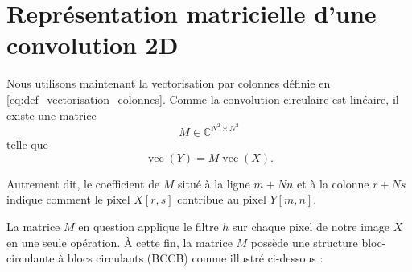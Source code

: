 \section{Représentation matricielle d'une convolution 2D}

Nous utilisons maintenant la vectorisation par colonnes définie en
\eqref{eq:def_vectorisation_colonnes}. Comme la convolution circulaire est linéaire, il existe
une matrice
\[
    M \in \mathbb{C}^{N^2\times N^2}
\]
telle que
\begin{equation}
    \operatorname{vec}(Y)
    =
    M\operatorname{vec}(X).
\end{equation}

Autrement dit, le coefficient de $M$ situé à la ligne $m+Nn$ et à la colonne $r+Ns$ indique comment le pixel
$X[r,s]$ contribue au pixel $Y[m,n]$.

La matrice $M$ en question applique le filtre $h$ sur chaque pixel de notre image $X$ en une seule opération.
À cette fin, la matrice $M$ possède une structure bloc-circulante à blocs circulants (BCCB)
comme illustré ci-dessous :

